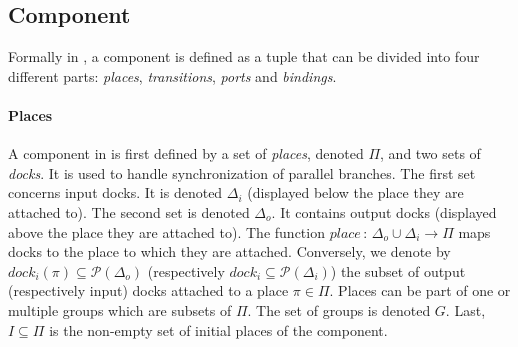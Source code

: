 \subsection{Component}

Formally in \mad, a component is defined as a tuple that can be divided
into four different parts: \emph{places}, \emph{transitions}, \emph{ports} and
\emph{bindings}.

\paragraph{Places}{

A component in \mad is first defined by a set of \emph{places}, denoted
$\Pi$, and two sets of \emph{docks}.  It is used to handle synchronization of parallel branches. The
first set concerns input docks. It is denoted $\Delta_{i}$
(displayed below the place they are attached to). The second set is
denoted $\Delta_{o}$. It contains output docks (displayed above
the place they are attached to).
The function $place\,:\,\Delta_{o}\cup\Delta_{i}\rightarrow\Pi$
maps docks to the place to which they are attached. Conversely, we denote by
$dock_i(\pi) \subseteq \mathcal{P}(\Delta_o)$ (respectively $dock_i \subseteq \mathcal{P}(\Delta_i)$)
the subset of output (respectively input) docks attached to a place
$\pi\in\Pi$. Places can be part of one or multiple groups which are
subsets of $\Pi$. The set of groups is denoted $G$. Last, $I \subseteq \Pi$ is the
non-empty set of initial places of the component.

}

